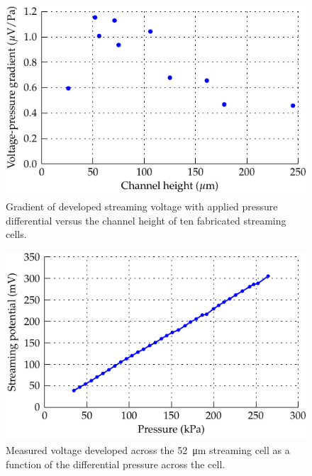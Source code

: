 \documentclass[10pt,final,journal]{IEEEtran}
\begin{document}
    \begin{figure}
        \begin{center}
        \includegraphics[width=\linewidth]{graph_cellEfficiency}
        \end{center}
        \caption{Gradient of developed streaming voltage with applied pressure differential versus the channel height of ten fabricated streaming cells.}
        \label{fig:cellEfficiency}
    \end{figure}

    \begin{figure}
        \begin{center}
        \includegraphics[width=\linewidth]{graph_voltagePressure}
        \end{center}
        \caption{Measured voltage developed across the \SI{52}{\micro\metre} streaming cell as a function of the differential pressure across the cell.}
        \label{fig:cellVoltagePressure}
    \end{figure}
\end{document}
